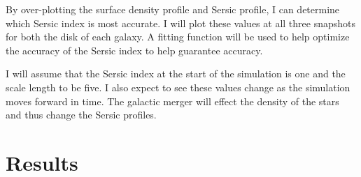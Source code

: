 \documentclass[linenumbers,trackchanges,twocolumn]{aastex7}
\begin{document}
By over-plotting the surface density profile and Sersic profile, I
can determine which Sersic index is most accurate. I will plot these
values at all three snapshots for both the disk of each galaxy. A fitting
function will be used to help optimize the accuracy of the Sersic
index to help guarantee accuracy.

I will assume that the Sersic index at the start of the simulation
is one and the scale length to be five. I also expect to see these values change as the
simulation moves forward in time. The galactic merger will effect the
density of the stars and thus change the Sersic profiles.

\section{Results} \label{sec:style}
\end{document}
